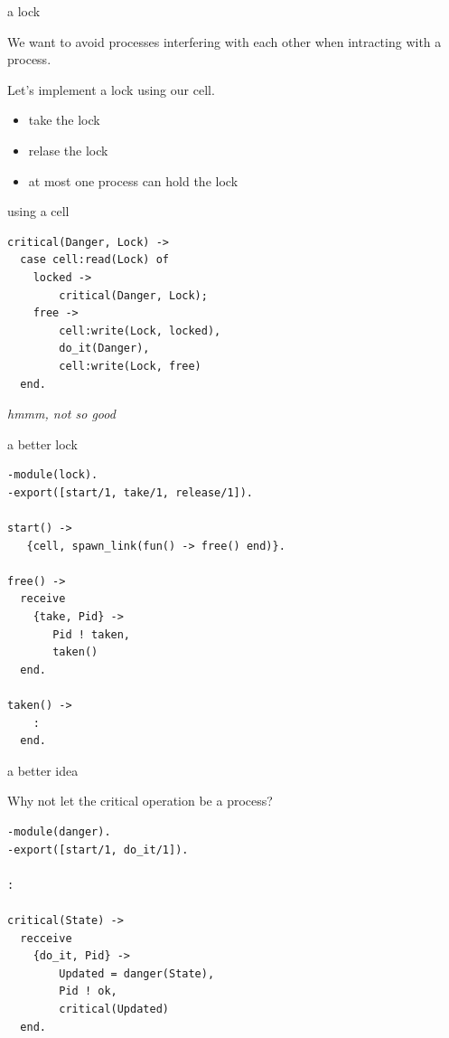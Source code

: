 \begin{frame}[fragile]{a lock}

\vspace{10pt}

We want to avoid processes interfering with each other when intracting
with a process.

\vspace{10pt}
Let's implement a lock using our cell.

\pause
\begin{itemize}
 \item take the lock
 \item relase the lock
 \item at most one process can hold the lock
\end{itemize}

\end{frame}


\begin{frame}[fragile]{using a cell}

\pause\vspace{20pt}

\begin{verbatim}
critical(Danger, Lock) -> 
  case cell:read(Lock) of
    locked ->
        critical(Danger, Lock);
    free ->
        cell:write(Lock, locked),
        do_it(Danger),
        cell:write(Lock, free)
  end.    
\end{verbatim}

\pause\vspace{20pt}
{\em hmmm, not so good}

\end{frame}

\begin{frame}[fragile]{a better lock}

\begin{verbatim}
-module(lock).
-export([start/1, take/1, release/1]).

start() ->
   {cell, spawn_link(fun() -> free() end)}.

free() ->
  receive 
    {take, Pid} ->
       Pid ! taken,
       taken()
  end.

taken() ->
    :
  end.
\end{verbatim}

\end{frame}

\begin{frame}[fragile]{a better idea}

Why not let the critical operation be a process?
\pause\vspace{20pt}
\begin{verbatim}
-module(danger).
-export([start/1, do_it/1]).
 
:

critical(State) ->
  recceive 
    {do_it, Pid} -> 
        Updated = danger(State),
        Pid ! ok,
        critical(Updated)
  end.
\end{verbatim}

\end{frame}

